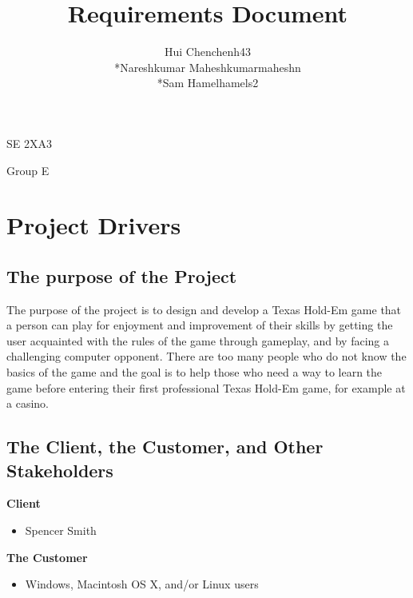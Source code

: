 \documentclass[12pt]{article}
\begin{document}
	\begin{titlepage}
	\title {Requirements Document}
	\maketitle
		\begin{center}
		SE 2XA3\\
		\author{
		Hui Chen\hspace{128pt}chenh43	
		\\*Nareshkumar Maheshkumar\hspace{35pt}maheshn 
		\\*Sam Hamel\hspace{118pt}hamels2 \\
		}

		Group E
		\end{center}
	\end{titlepage}
	
	\newpage
	\tableofcontents
	\listoffigures
	\listoftables

	\newpage
	\section{Project Drivers}
	\subsection{The purpose of the Project}
	The purpose of the project is to design and develop a Texas Hold-Em game that a person 		can play for enjoyment and improvement of their skills by getting the user acquainted 		with the rules of the game through gameplay, and by facing a challenging computer 			opponent. There are too many people who do not know the basics of the game and the goal 	is to help those who need a way to learn the game before entering their first 				professional Texas Hold-Em game, for example at a casino.
	\subsection{The Client, the Customer, and Other Stakeholders}
	\textbf{Client}
	\begin{itemize}
	\item Spencer Smith
	\end{itemize}
	\textbf{The Customer}
	\begin{itemize}
	\item Windows, Macintosh OS X, and/or Linux users
	\end{itemize}
	
\end{document}

